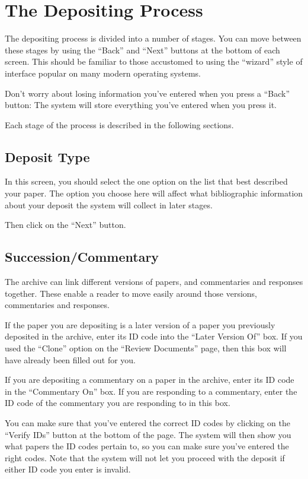 \section{The Depositing Process}


The depositing process is divided into a number of stages. You can move between these stages by using the ``Back'' and ``Next'' buttons at the bottom of each screen. This should be familiar to those accustomed to using the ``wizard'' style of interface popular on many modern operating systems.

Don't worry about losing information you've entered when you press a ``Back'' button: The system will store everything you've entered when you press it.

Each stage of the process is described in the following sections.


\subsection{Deposit Type}

In this screen, you should select the one option on the list that best described your paper. The option you choose here will affect what bibliographic information about your deposit the system will collect in later stages.

Then click on the ``Next'' button.


\subsection{Succession/Commentary}

The archive can link different versions of papers, and commentaries and responses together. These enable a reader to move easily around those versions, commentaries and responses.

If the paper you are depositing is a later version of a paper you previously deposited in the archive, enter its ID code into the ``Later Version Of'' box. If you used the ``Clone'' option on the ``Review Documents'' page, then this box will have already been filled out for you.

If you are depositing a commentary on a paper in the archive, enter its ID code in the ``Commentary On'' box. If you are responding to a commentary, enter the ID code of the commentary you are responding to in this box.

You can make sure that you've entered the correct ID codes by clicking on the ``Verify IDs'' button at the bottom of the page. The system will then show you what papers the ID codes pertain to, so you can make sure you've entered the right codes. Note that the system will not let you proceed with the deposit if either ID code you enter is invalid.

